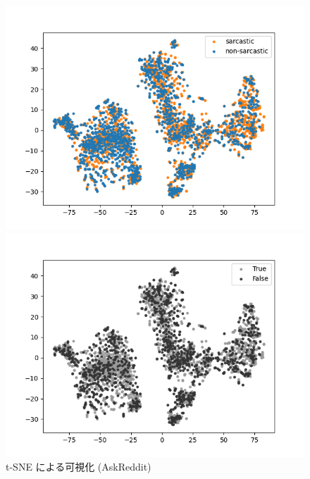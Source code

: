 \begin{figure}[tb]
\begin{center}
 	\begin{minipage}{0.4\hsize}
	\begin{center}
\includegraphics[width=\linewidth]{./figure/tsne_sarc_ask.png}
	\end{center}
	\end{minipage}
 	\begin{minipage}{0.4\hsize}
	\begin{center}
\includegraphics[width=\linewidth]{./figure/tsne_TorF_ask.png}
 	 \end{center}
 	\end{minipage}
	\caption{t-SNE による可視化 (AskReddit)}
	\label{fig:40_tsne2}
\end{center}
\end{figure}

